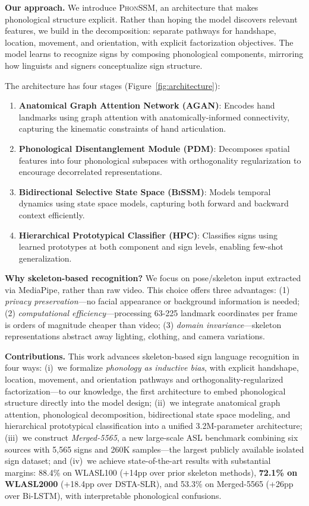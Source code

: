 \documentclass{article}
\theoremstyle{definition}
\theoremstyle{remark}
\newcommand{\phonssm}{\textsc{PhonSSM}}
\newcommand{\agan}{\textsc{AGAN}}
\newcommand{\pdm}{\textsc{PDM}}
\newcommand{\bissm}{\textsc{BiSSM}}
\newcommand{\hpc}{\textsc{HPC}}
\begin{document}
\textbf{Our approach.} We introduce \phonssm{}, an architecture that makes phonological structure explicit. Rather than hoping the model discovers relevant features, we build in the decomposition: separate pathways for handshape, location, movement, and orientation, with explicit factorization objectives. The model learns to recognize signs by composing phonological components, mirroring how linguists and signers conceptualize sign structure.

The architecture has four stages (Figure~\ref{fig:architecture}):
\begin{enumerate}[nosep,topsep=2pt]
\item \textbf{Anatomical Graph Attention Network (\agan{})}: Encodes hand landmarks using graph attention with anatomically-informed connectivity, capturing the kinematic constraints of hand articulation.
\item \textbf{Phonological Disentanglement Module (\pdm{})}: Decomposes spatial features into four phonological subspaces with orthogonality regularization to encourage decorrelated representations.
\item \textbf{Bidirectional Selective State Space (\bissm{})}: Models temporal dynamics using state space models, capturing both forward and backward context efficiently.
\item \textbf{Hierarchical Prototypical Classifier (\hpc{})}: Classifies signs using learned prototypes at both component and sign levels, enabling few-shot generalization.
\end{enumerate}%

\textbf{Why skeleton-based recognition?} We focus on pose/skeleton input extracted via MediaPipe, rather than raw video. This choice offers three advantages: (1) \textit{privacy preservation}---no facial appearance or background information is needed; (2) \textit{computational efficiency}---processing 63-225 landmark coordinates per frame is orders of magnitude cheaper than video; (3) \textit{domain invariance}---skeleton representations abstract away lighting, clothing, and camera variations.

\textbf{Contributions.} This work advances skeleton-based sign language recognition in four ways: (i)~we formalize \emph{phonology as inductive bias}, with explicit handshape, location, movement, and orientation pathways and orthogonality-regularized factorization---to our knowledge, the first architecture to embed phonological structure directly into the model design; (ii)~we integrate anatomical graph attention, phonological decomposition, bidirectional state space modeling, and hierarchical prototypical classification into a unified 3.2M-parameter architecture; (iii)~we construct \emph{Merged-5565}, a new large-scale ASL benchmark combining six sources with 5,565 signs and 260K samples---the largest publicly available isolated sign dataset; and (iv)~we achieve state-of-the-art results with substantial margins: 88.4\% on WLASL100 (+14pp over prior skeleton methods), \textbf{72.1\% on WLASL2000} (+18.4pp over DSTA-SLR), and 53.3\% on Merged-5565 (+26pp over Bi-LSTM), with interpretable phonological confusions.
\end{document}
